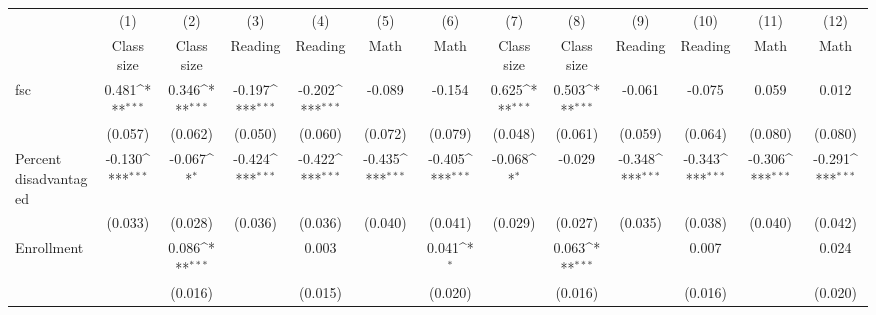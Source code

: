{
\def\sym#1{\ifmmode^{#1}\else\(^{#1}\)\fi}
\begin{tabular}{l*{12}{c}}
\toprule
            &\multicolumn{1}{c}{(1)}&\multicolumn{1}{c}{(2)}&\multicolumn{1}{c}{(3)}&\multicolumn{1}{c}{(4)}&\multicolumn{1}{c}{(5)}&\multicolumn{1}{c}{(6)}&\multicolumn{1}{c}{(7)}&\multicolumn{1}{c}{(8)}&\multicolumn{1}{c}{(9)}&\multicolumn{1}{c}{(10)}&\multicolumn{1}{c}{(11)}&\multicolumn{1}{c}{(12)}\\
            &\multicolumn{1}{c}{Class size}&\multicolumn{1}{c}{Class size}&\multicolumn{1}{c}{Reading}&\multicolumn{1}{c}{Reading}&\multicolumn{1}{c}{Math}&\multicolumn{1}{c}{Math}&\multicolumn{1}{c}{Class size}&\multicolumn{1}{c}{Class size}&\multicolumn{1}{c}{Reading}&\multicolumn{1}{c}{Reading}&\multicolumn{1}{c}{Math}&\multicolumn{1}{c}{Math}\\
\midrule
fsc         &       0.481\sym{***}&       0.346\sym{***}&      -0.197\sym{***}&      -0.202\sym{***}&      -0.089         &      -0.154         &       0.625\sym{***}&       0.503\sym{***}&      -0.061         &      -0.075         &       0.059         &       0.012         \\
            &     (0.057)         &     (0.062)         &     (0.050)         &     (0.060)         &     (0.072)         &     (0.079)         &     (0.048)         &     (0.061)         &     (0.059)         &     (0.064)         &     (0.080)         &     (0.080)         \\
\addlinespace
Percent disadvantaged&      -0.130\sym{***}&      -0.067\sym{*}  &      -0.424\sym{***}&      -0.422\sym{***}&      -0.435\sym{***}&      -0.405\sym{***}&      -0.068\sym{*}  &      -0.029         &      -0.348\sym{***}&      -0.343\sym{***}&      -0.306\sym{***}&      -0.291\sym{***}\\
            &     (0.033)         &     (0.028)         &     (0.036)         &     (0.036)         &     (0.040)         &     (0.041)         &     (0.029)         &     (0.027)         &     (0.035)         &     (0.038)         &     (0.040)         &     (0.042)         \\
\addlinespace
Enrollment  &                     &       0.086\sym{***}&                     &       0.003         &                     &       0.041\sym{*}  &                     &       0.063\sym{***}&                     &       0.007         &                     &       0.024         \\
            &                     &     (0.016)         &                     &     (0.015)         &                     &     (0.020)         &                     &     (0.016)         &                     &     (0.016)         &                     &     (0.020)         \\

\end{tabular}}
